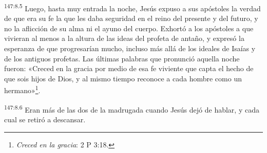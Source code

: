 \par
\textsuperscript{147:8.5} Luego, hasta muy entrada la noche, Jesús expuso a sus apóstoles la verdad de que era su fe la que les daba seguridad en el reino del presente y del futuro, y no la aflicción de su alma ni el ayuno del cuerpo. Exhortó a los apóstoles a que vivieran al menos a la altura de las ideas del profeta de antaño, y expresó la esperanza de que progresarían mucho, incluso más allá de los ideales de Isaías y de los antiguos profetas. Las últimas palabras que pronunció aquella noche fueron: «Creced en la gracia por medio de esa fe viviente que capta el hecho de que sois hijos de Dios, y al mismo tiempo reconoce a cada hombre como un hermano»\footnote{\textit{Creced en la gracia}: 2 P 3:18.}.

\par
\textsuperscript{147:8.6} Eran más de las dos de la madrugada cuando Jesús dejó de hablar, y cada cual se retiró a descansar.